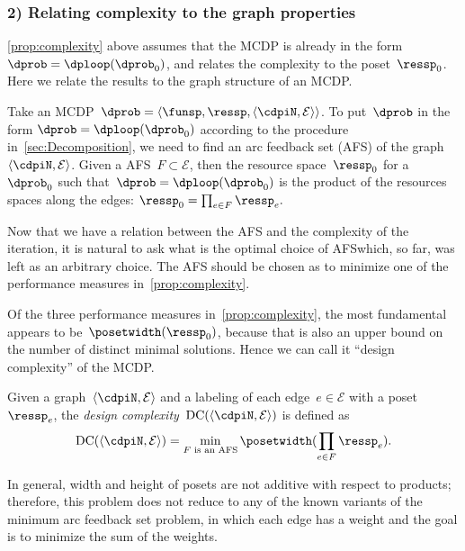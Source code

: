 \subsubsection{2) Relating complexity to the graph properties}

\cref{prop:complexity} above assumes that the MCDP is already in the
form $\dprob=\dploop(\dprob_{0})$, and relates the complexity to
the poset~$\ressp_{0}$. Here we relate the results to the graph
structure of an MCDP.

Take an MCDP~$\dprob=\left\langle \funsp,\ressp,\left\langle \cdpiN,\mathcal{E}\right\rangle \right\rangle $.
To put~$\dprob$ in the form $\dprob=\dploop(\dprob_{0})$ according
to the procedure in~\cref{sec:Decomposition}, we need to find an arc
feedback set (AFS) of the graph~$\left\langle \cdpiN,\mathcal{E}\right\rangle $.
Given a AFS~$F\subset\mathcal{E}$, then the resource space~$\ressp_{0}$
for a~$\dprob_{0}$ such that~$\dprob=\dploop(\dprob_{0})$ is the
product of the resources spaces along the edges: $\ressp_{0}=\prod_{e\in F}\ressp_{e}.$

Now that we have a relation between the AFS and the complexity of
the iteration, it is natural to ask what is the optimal choice of
AFS\textemdash which, so far, was left as an arbitrary choice. The
AFS should be chosen as to minimize one of the performance measures
in~\cref{prop:complexity}. 

Of the three performance measures in~\cref{prop:complexity}, the most
fundamental appears to be~$\posetwidth(\ressp_{0})$, because that
is also an upper bound on the number of distinct minimal solutions.
Hence we can call it ``design complexity'' of the MCDP.
\begin{definition}
\label{def:design-complexity}Given a graph~$\left\langle \cdpiN,\mathcal{E}\right\rangle $
and a labeling of each edge~$e\in\mathcal{E}$ with a poset~$\ressp_{e}$,
the \emph{design complexity~}$\text{DC}(\left\langle \cdpiN,\mathcal{E}\right\rangle )$
is defined as 
\begin{equation}
\text{DC}(\left\langle \cdpiN,\mathcal{E}\right\rangle )=\min_{F\text{ is an AFS}}\posetwidth(\prod_{e\in F}\ressp_{e}).\label{eq:complexity}
\end{equation}
\end{definition}
In general, width and height of posets are not additive with respect
to products; therefore, this problem does not reduce to any of the
known variants of the minimum arc feedback set problem, in which
each edge has a weight and the goal is to minimize the sum of the
weights.

